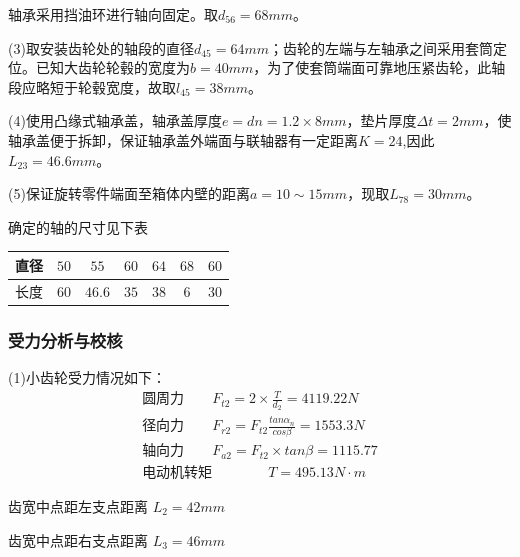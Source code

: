 轴承采用挡油环进行轴向固定。取$d_{56}=68mm$。

(3)取安装齿轮处的轴段的直径$d_{45} = 64mm$；齿轮的左端与左轴承之间采用套筒定位。已知大齿轮轮毂的宽度为$b=40 mm$，为了使套筒端面可靠地压紧齿轮，此轴段应略短于轮毂宽度，故取$l_{45} = 38 mm$。

(4)使用凸缘式轴承盖，轴承盖厚度$e=dn=1.2\times 8mm$，垫片厚度$\Delta t=2mm$，使轴承盖便于拆卸，保证轴承盖外端面与联轴器有一定距离$K=24$,因此$L_{23}=46.6mm$。

(5)保证旋转零件端面至箱体内壁的距离$a=10\sim 15mm$，现取$L_{78}=30mm$。

确定的轴的尺寸见下表

\begin{tabular}{|c|c|c|c|c|c|c|}
    \hline
    直径& $50$&$55$&$60$&$64$&$68$&$60$\\
    \hline
    长度&$60$&$46.6$&$35$&$38$&$6$&$30$\\
    \hline
\end{tabular}
\subsubsection{受力分析与校核}
(1)小齿轮受力情况如下：
\begin{align}
    \text{圆周力}       \qquad   F_{t2}=2\times \frac{T}{d_2}=4119.22N \\
    \text{径向力} \qquad          F_{r2}=F_{t2}\frac{tan\alpha_n}{cos \beta}=1553.3N\\
    \text{轴向力}       \qquad          F_{a2}=F_{t2}\times tan\beta =1115.77\\
    \text{电动机转矩} \qquad\qquad      T=495.13N\cdot m
\end{align}

齿宽中点距左支点距离 $L_2 =42mm$

齿宽中点距右支点距离 $L_3 =46mm$

